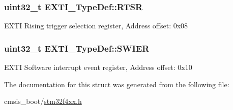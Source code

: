\subsubsection[{\texorpdfstring{R\+T\+SR}{RTSR}}]{ uint32\+\_\+t E\+X\+T\+I\+\_\+\+Type\+Def\+::\+R\+T\+SR}\hypertarget{struct_e_x_t_i___type_def_ac019d211d8c880b327a1b90a06cc0675}{}\label{struct_e_x_t_i___type_def_ac019d211d8c880b327a1b90a06cc0675}
E\+X\+TI Rising trigger selection register, Address offset\+: 0x08 
\subsubsection[{\texorpdfstring{S\+W\+I\+ER}{SWIER}}]{ uint32\+\_\+t E\+X\+T\+I\+\_\+\+Type\+Def\+::\+S\+W\+I\+ER}\hypertarget{struct_e_x_t_i___type_def_a5c1f538e64ee90918cd158b808f5d4de}{}\label{struct_e_x_t_i___type_def_a5c1f538e64ee90918cd158b808f5d4de}
E\+X\+TI Software interrupt event register, Address offset\+: 0x10 

The documentation for this struct was generated from the following file\+:\begin{DoxyCompactItemize}
\item 
cmsis\+\_\+boot/\hyperlink{stm32f4xx_8h}{stm32f4xx.\+h}\end{DoxyCompactItemize}
